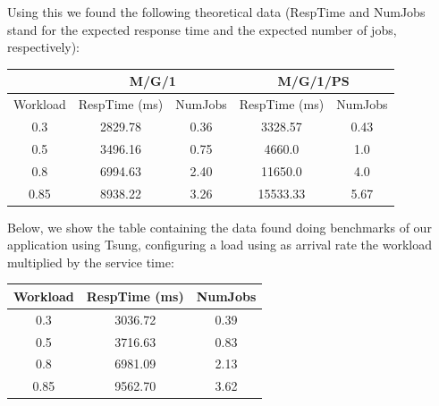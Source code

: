 \documentclass[11pt]{scrartcl} %
\begin{document}
Using this we found the following theoretical data (RespTime and NumJobs stand for the expected response time and the expected number of jobs, respectively):

\begin{table}[H]
\centering
\begin{tabular}{c|c|c|cc}
\multicolumn{1}{l|}{}         & \multicolumn{2}{c|}{M/G/1}                                                        & \multicolumn{2}{c}{M/G/1/PS}                                                     \\ \hline
\multicolumn{1}{l|}{Workload} & \multicolumn{1}{l|}{RespTime (ms)} & \multicolumn{1}{l|}{NumJobs} & \multicolumn{1}{l|}{RespTime (ms)} & \multicolumn{1}{l}{NumJobs} \\ \hline
0.3                           & 2829.78                            & 0.36                                         & \multicolumn{1}{c|}{3328.57}       & 0.43                                        \\
0.5                           & 3496.16                            & 0.75                                         & \multicolumn{1}{c|}{4660.0}        & 1.0                                         \\
0.8                           & 6994.63                            & 2.40                                         & \multicolumn{1}{c|}{11650.0}       & 4.0                                         \\
0.85                          & 8938.22                            & 3.26                                         & \multicolumn{1}{c|}{15533.33}      & 5.67                                       
\end{tabular}
\end{table}

Below, we show the table containing the data found doing benchmarks of our application using Tsung, configuring a load using as arrival rate the workload multiplied by the service time:

\begin{table}[H]
\centering
\begin{tabular}{c|c|c}
\multicolumn{1}{l|}{Workload} & \multicolumn{1}{l|}{RespTime (ms)} & \multicolumn{1}{l}{NumJobs} \\ \hline
0.3                           & 3036.72                            & 0.39                         \\
0.5                           & 3716.63                            & 0.83                         \\
0.8                           & 6981.09                            & 2.13                         \\
0.85                          & 9562.70                            & 3.62                        
\end{tabular}
\end{table}
\end{document}
